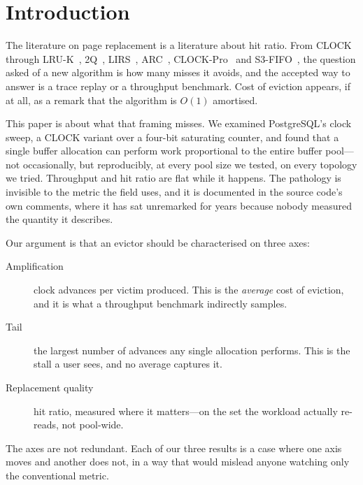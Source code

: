 \documentclass[sigconf,nonacm]{acmart}
\begin{document}

\maketitle

\section{Introduction}

The literature on page replacement is a literature about hit ratio. From
CLOCK~\cite{corbato1968paging} through LRU-K~\cite{oneil1993lruk},
2Q~\cite{johnson1994lru2}, LIRS~\cite{jiang2002lirs},
ARC~\cite{megiddo2003arc}, CLOCK-Pro~\cite{jiang2005clockpro} and
S3-FIFO~\cite{yang2023s3fifo}, the question asked of a new algorithm is how
many misses it avoids, and the accepted way to answer is a trace replay or a
throughput benchmark. Cost of eviction appears, if at all, as a remark that the
algorithm is $O(1)$ amortised.

This paper is about what that framing misses. We examined PostgreSQL's clock
sweep, a CLOCK variant over a four-bit saturating counter, and found that a
single buffer allocation can perform work proportional to the entire buffer
pool---not occasionally, but reproducibly, at every pool size we tested, on
every topology we tried. Throughput and hit ratio are flat while it happens.
The pathology is invisible to the metric the field uses, and it is documented in
the source code's own comments, where it has sat unremarked for years because
nobody measured the quantity it describes.

Our argument is that an evictor should be characterised on three axes:

\begin{description}
\item[Amplification] clock advances per victim produced. This is the
  \emph{average} cost of eviction, and it is what a throughput benchmark
  indirectly samples.
\item[Tail] the largest number of advances any single allocation performs.
  This is the stall a user sees, and no average captures it.
\item[Replacement quality] hit ratio, measured where it matters---on the set
  the workload actually re-reads, not pool-wide.
\end{description}

The axes are not redundant. Each of our three results is a case where one axis
moves and another does not, in a way that would mislead anyone watching only
the conventional metric.
\end{document}
